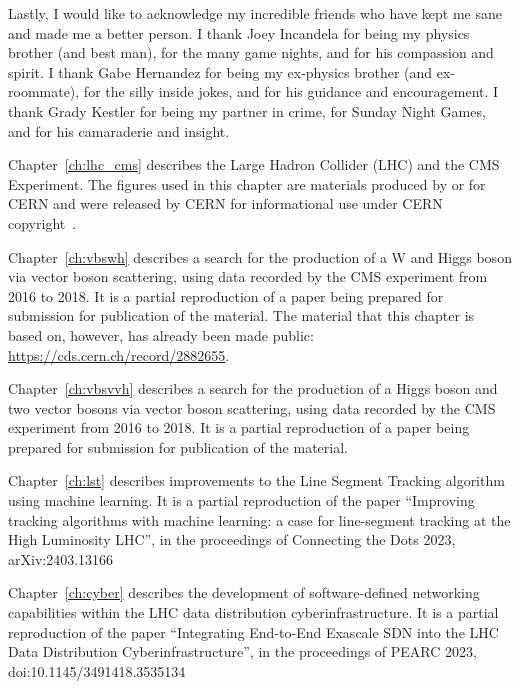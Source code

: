 \begin{acknowledgements}
Lastly, I would like to acknowledge my incredible friends who have kept me sane and made me a better person. 
I thank Joey Incandela for being my physics brother (and best man), for the many game nights, and for his compassion and spirit. 
I thank Gabe Hernandez for being my ex-physics brother (and ex-roommate), for the silly inside jokes, and for his guidance and encouragement. 
I thank Grady Kestler for being my partner in crime, for Sunday Night Games, and for his camaraderie and insight. 

Chapter~\ref{ch:lhc_cms} describes the Large Hadron Collider (LHC) and the CMS Experiment. 
The figures used in this chapter are materials produced by or for CERN and were released by CERN for informational use under CERN copyright~\cite{CERNCopyright}. 

Chapter~\ref{ch:vbswh} describes a search for the production of a W and Higgs boson via vector boson scattering, using data recorded by the CMS experiment from 2016 to 2018. 
It is a partial reproduction of a paper being prepared for submission for publication of the material. 
The material that this chapter is based on, however, has already been made public: \url{https://cds.cern.ch/record/2882655}.

Chapter~\ref{ch:vbsvvh} describes a search for the production of a Higgs boson and two vector bosons via vector boson scattering, using data recorded by the CMS experiment from 2016 to 2018. 
It is a partial reproduction of a paper being prepared for submission for publication of the material. 

Chapter~\ref{ch:lst} describes improvements to the Line Segment Tracking algorithm using machine learning. 
It is a partial reproduction of the paper ``Improving tracking algorithms with machine learning: a case for line-segment tracking at the High Luminosity LHC'', in the proceedings of Connecting the Dots 2023, arXiv:2403.13166

Chapter~\ref{ch:cyber} describes the development of software-defined networking capabilities within the LHC data distribution cyberinfrastructure. 
It is a partial reproduction of the paper ``Integrating End-to-End Exascale SDN into the LHC Data Distribution Cyberinfrastructure'', in the proceedings of PEARC 2023, doi:10.1145/3491418.3535134

\end{acknowledgements}
